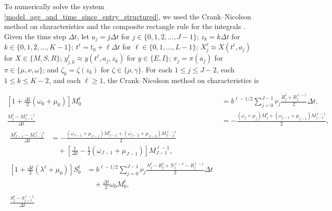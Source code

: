 \documentclass{jpmarticle}
\let\subequationsorig\subequations%
\let\endsubequationsorig\endsubequations%
\renewenvironment{subequations}{
  \subequationsorig
  \renewcommand{\theequation}{\theparentequation.\arabic{equation}}
}{
  \endsubequationsorig
}
\begin{document}
To numerically solve the system
\eqref{model_age_and_time_since_entry_structured}, we used the
Crank--Nicolson method on characteristics and the composite rectangle
rule for the integrals \autocite{milner_1992}.  Given the time step
$\Delta t$, let $a_j = j \Delta t$ for
$j \in \{0, 1, 2, \ldots, J - 1\}$;
$z_k = k \Delta t$
for $k \in \{0, 1, 2, \ldots, K - 1\}$;
$t^{\ell} = t_0 + \ell \Delta t$ for
$\ell \in \{0, 1, \ldots, L - 1\}$;
$X_j^{\ell} \approx X(t^{\ell}, a_j)$
for $X \in \{M, S, R\}$;
$y_{j, k}^{\ell} \approx y(t^{\ell}, a_j, z_k)$
for $y \in \{E, I\}$;
$\pi_j = \pi(a_j)$ for $\pi \in \{\mu, \nu, \omega\}$; and
$\zeta_k = \zeta(z_k)$ for $\zeta \in \{\rho, \gamma\}$.
For each $1 \leq j \leq J - 2$, each $1 \leq k \leq K - 2$, and each
$\ell \geq 1$, the Crank--Nicolson method on characteristics is
\begin{subequations}
  \label{numerics_age_and_time_since_entry_structured}
  \begin{align}
    \left[1 + \frac{\Delta t}{2} (\omega_0 + \mu_0)\right] M_0^{\ell}
    &= b^{\ell - 1 / 2}
    \sum_{j = 0}^{J - 1} \nu_j \frac{R_j^{\ell} + R_j^{\ell - 1}}{2}
    \Delta t,
    \\
    \frac{M_j^{\ell} - M_{j - 1}^{\ell - 1}}{\Delta t}
    &=
    - \frac{(\omega_j + \mu_j) M_j^{\ell}
      + (\omega_{j - 1} + \mu_{j - 1}) M_{j - 1}^{\ell - 1}}
    {2},
    \\
    \begin{split}
      \frac{M_{J - 1}^{\ell} - M_{J - 2}^{\ell - 1}}{\Delta t}
      &=
      - \frac{(\omega_{J - 1} + \mu_{J - 1}) M_{J - 1}^{\ell}
        + (\omega_{J - 2} + \mu_{J - 2}) M_{J - 2}^{\ell - 1}}
      {2}
      \\ & \quad {}
      +  \left[\frac{1}{\Delta t}
        - \frac{1}{2} (\omega_{J - 1} + \mu_{J - 1})\right]
      M_{J - 1}^{\ell - 1},
    \end{split}
    \\
    \begin{split}
      \left[1 + \frac{\Delta t}{2} (\lambda^{\ell} + \mu_0)\right] S_0^{\ell}
      &=
      b^{\ell - 1 / 2}
      \sum_{j = 0}^{J - 1} \nu_j
      \frac{N_j^{\ell} - R_j^{\ell} + N_j^{\ell - 1} - R_j^{\ell - 1}}
      {2}
      \Delta t
      \\ & \quad {}
      + \frac{\Delta t}{2} \omega_0 M_0^{\ell},
    \end{split}
    \\
    \begin{split}
      \frac{S_j^{\ell} - S_{j - 1}^{\ell - 1}}{\Delta t}

\end{split}
\end{align}
\end{subequations}
\end{document}
